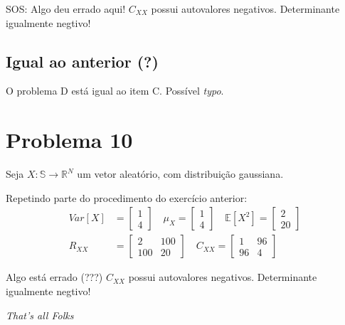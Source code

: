 \documentclass{article}
\begin{document}
SOS: Algo deu errado aqui!  $C_{XX}$ possui autovalores negativos. Determinante igualmente negtivo!

\subsection{Igual ao anterior (?)}
O problema D está igual ao item C. Possível \textit{typo}.


\section{Problema 10}
Seja $X: \mathbb{S} \to \mathbb{R}^N$ um vetor aleatório, com distribuição gaussiana.

Repetindo parte do procedimento do exercício anterior:
\begin{align*}
    Var[X] &= \begin{bmatrix} 1\\4 \end{bmatrix} \quad \mu_X = \begin{bmatrix} 1\\4 \end{bmatrix}
    \quad \mathbb{E}[X^2] = \begin{bmatrix} 2\\20 \end{bmatrix} \\
    R_{XX} &= \begin{bmatrix} 2&100\\100&20 \end{bmatrix} \quad C_{XX} = \begin{bmatrix} 1&96\\96&4 \end{bmatrix}
\end{align*}

Algo está errado (???)
$C_{XX}$ possui autovalores negativos. Determinante igualmente negtivo!

\textit{That's all Folks}
\end{document}
